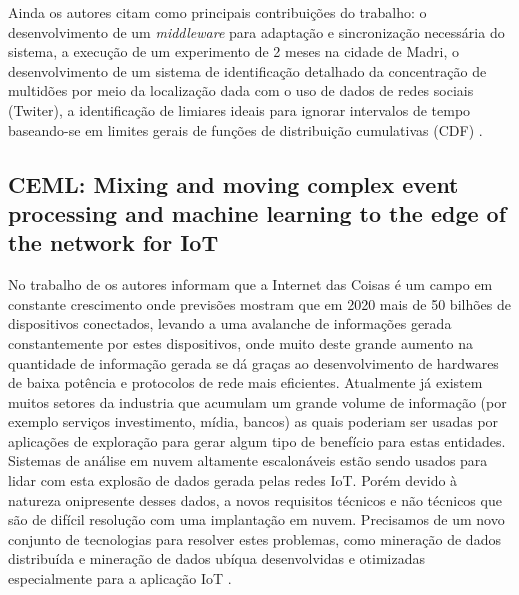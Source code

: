 \documentclass[ti,table]{texufpel} %
\begin{document}
    Ainda os autores citam como principais contribuições do trabalho: o desenvolvimento de um \textit{middleware} para adaptação e sincronização necessária do sistema, a execução de um experimento de 2 meses na cidade de Madri, o desenvolvimento de um sistema de identificação detalhado da concentração  de multidões por meio da localização dada com o uso de dados de redes sociais (Twiter), a identificação de limiares ideais para ignorar intervalos de tempo baseando-se em limites gerais de funções de distribuição cumulativas (CDF) \cite{art9kousiouris2018integrated}. 

  

  

  

\subsection{CEML: Mixing and moving complex event processing and machine learning to the edge of the network for IoT} 

  

    No trabalho de \cite{art10soto2016ceml} os autores informam que a Internet das Coisas é um campo em constante crescimento onde previsões mostram que em 2020 mais de 50 bilhões de dispositivos conectados, levando a uma avalanche de informações gerada constantemente por estes dispositivos, onde muito deste grande aumento na quantidade de informação gerada se dá graças ao desenvolvimento de hardwares de baixa potência e protocolos de rede mais eficientes. Atualmente já existem muitos setores da industria que acumulam um grande volume de informação (por exemplo serviços investimento, mídia, bancos) as quais poderiam ser usadas por aplicações de exploração para gerar algum tipo de benefício para estas entidades. Sistemas de análise em nuvem altamente escalonáveis estão sendo usados para lidar com esta explosão de dados gerada pelas redes IoT. Porém devido à natureza onipresente desses dados, a novos requisitos técnicos e não técnicos que são de difícil resolução com uma implantação em nuvem. Precisamos de um novo conjunto de tecnologias para resolver estes problemas, como mineração de dados distribuída e mineração de dados ubíqua desenvolvidas e otimizadas especialmente para a aplicação IoT . 

     
\end{document}
